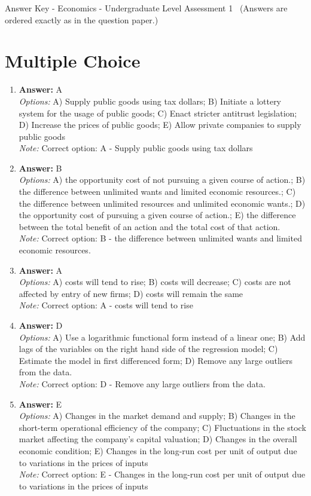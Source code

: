 \documentclass[12pt]{article}
\begin{document}
\begin{center}
Answer Key - Economics - Undergraduate Level Assessment 1 \
\small (Answers are ordered exactly as in the question paper.)
\end{center}

\section*{Multiple Choice}
\begin{enumerate}[label=\arabic*.]
\item \textbf{Answer:} A
\\ \textit{Options:} A) Supply public goods using tax dollars; B) Initiate a lottery system for the usage of public goods; C) Enact stricter antitrust legislation; D) Increase the prices of public goods; E) Allow private companies to supply public goods
\\ \textit{Note:} Correct option: A - Supply public goods using tax dollars
\item \textbf{Answer:} B
\\ \textit{Options:} A) the opportunity cost of not pursuing a given course of action.; B) the difference between unlimited wants and limited economic resources.; C) the difference between unlimited resources and unlimited economic wants.; D) the opportunity cost of pursuing a given course of action.; E) the difference between the total benefit of an action and the total cost of that action.
\\ \textit{Note:} Correct option: B - the difference between unlimited wants and limited economic resources.
\item \textbf{Answer:} A
\\ \textit{Options:} A) costs will tend to rise; B) costs will decrease; C) costs are not affected by entry of new firms; D) costs will remain the same
\\ \textit{Note:} Correct option: A - costs will tend to rise
\item \textbf{Answer:} D
\\ \textit{Options:} A) Use a logarithmic functional form instead of a linear one; B) Add lags of the variables on the right hand side of the regression model; C) Estimate the model in first differenced form; D) Remove any large outliers from the data.
\\ \textit{Note:} Correct option: D - Remove any large outliers from the data.
\item \textbf{Answer:} E
\\ \textit{Options:} A) Changes in the market demand and supply; B) Changes in the short-term operational efficiency of the company; C) Fluctuations in the stock market affecting the company's capital valuation; D) Changes in the overall economic condition; E) Changes in the long-run cost per unit of output due to variations in the prices of inputs
\\ \textit{Note:} Correct option: E - Changes in the long-run cost per unit of output due to variations in the prices of inputs
\end{enumerate}
\end{document}
